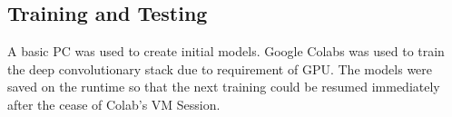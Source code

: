 \subsection{Training and Testing}
A basic PC was used to create initial models. Google Colabs was used to train the deep convolutionary stack due to requirement of GPU. The models were saved on the runtime so that the next training could be resumed immediately after the cease of Colab's VM Session.
